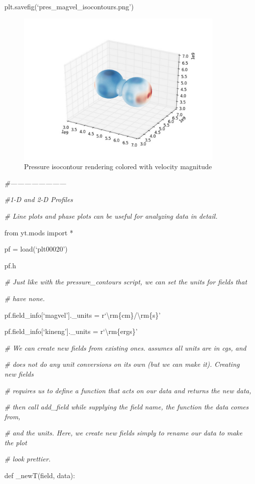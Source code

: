 plt.savefig(`pres\_magvel\_isocontours.png')
\begin{figure}[h]
\centering
\includegraphics[width=4in]{isocontours}
\caption{Pressure isocontour rendering colored with velocity magnitude}
\end{figure}

{\it\#------------------------}

{\it\#1-D and 2-D Profiles}
{\setlength{\parskip}{0pt}

{\it\# Line plots and phase plots can be useful for analyzing data in detail.}

from yt.mods import *
}

pf = load(`plt00020')

pf.h

{\it\# Just like with the pressure\_contours script, we can set the units for fields that}
{\setlength{\parskip}{0pt}

{\it\# have none.}

pf.field\_info[`magvel'].\_units = r`\textbackslash rm\{cm\}/\textbackslash rm\{s\}'
}

pf.field\_info[`kineng'].\_units = r`\textbackslash rm\{ergs\}'

{\it\# We can create new fields from existing ones. \yt assumes all units are in cgs, and}
{\setlength{\parskip}{0pt}

{\it\# does not do any unit conversions on its own (but we can make it). Creating new fields}

{\it\#  requires us to define a function that acts on our data and returns the new data,}

{\it\# then call add\_field while supplying the field name, the function the data comes from,}

{\it\# and the units. Here, we create new fields simply to rename our data to make the plot}

{\it\# look prettier.}

def \_newT(field, data):
}


